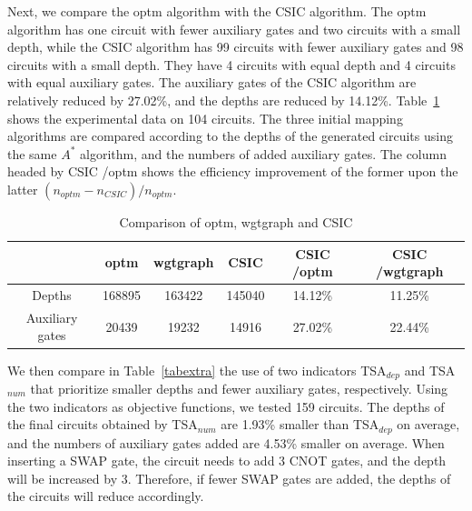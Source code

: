 \documentclass[runningheads]{llncs}
\begin{document}
Next, we compare the optm algorithm with the CSIC algorithm. The optm algorithm has one circuit with fewer auxiliary gates and two circuits with a small depth, while the CSIC algorithm has 99 circuits with fewer auxiliary gates and 98 circuits with a small depth.  
They have 4 circuits with equal depth and 4 circuits with equal auxiliary gates. The auxiliary gates of the CSIC algorithm are relatively reduced by 27.02\%, and the depths are reduced by 14.12\%. Table~\ref{tab1} shows the experimental data on 104 circuits. The three initial mapping algorithms are compared according to the depths of the generated circuits using the same $A^{*}$ algorithm, and the numbers of added auxiliary gates. The column headed by CSIC /optm  shows the efficiency improvement of the former upon the latter $(n_{optm}-n_{CSIC })/n_{optm}$.
\begin{table}[t]
	\begin{center}  
	\begin{tabular}{|c|c|c|c|c|c|}
	\hline
	    	&  optm & wgtgraph &CSIC & CSIC /optm & CSIC /wgtgraph\\
	\hline
	 Depths 	&	168895	&   163422	&  145040 	& 14.12\%  &11.25\%   \\
	\hline
	 Auxiliary gates 	&	20439	&  19232 	&  14916 & 27.02\% 	&  22.44\%  \\
	\hline
	\end{tabular} 
	\end{center} 
	\caption{Comparison of optm, wgtgraph and CSIC}
	\label{tab1}
	\end{table}

	We then compare in Table~\ref{tabextra} the use of two indicators TSA$_{dep}$ and TSA$_{num}$ that prioritize smaller depths and fewer auxiliary gates, respectively. Using the two indicators  as objective functions, we tested 159 circuits. The depths of the final circuits obtained by TSA$_{num}$ are 1.93\% smaller than TSA$_{dep}$ on average, and the numbers of auxiliary gates added are 4.53\% smaller on average. When inserting a SWAP gate, the circuit needs to add 3 CNOT gates, and the depth will be increased by 3.  Therefore, if fewer SWAP gates are added, the depths of the circuits will reduce accordingly. 
\end{document}
